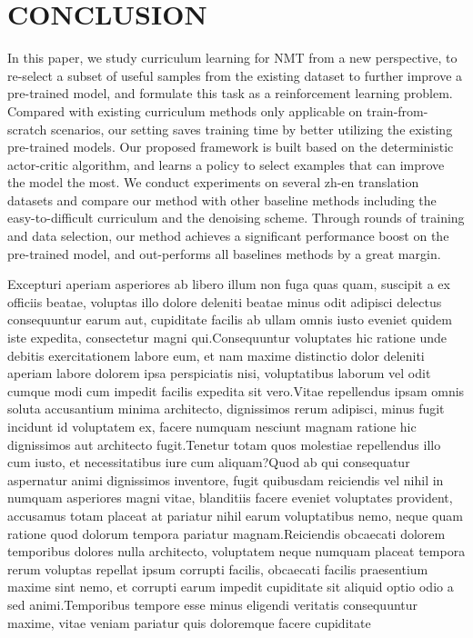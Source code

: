 \documentclass[letterpaper]{article}
\begin{document}
\section{CONCLUSION}
\label{sec:conclude}

In this paper, we study curriculum learning for NMT from a new perspective, to re-select a subset of useful samples from the existing dataset to further improve a pre-trained model, and formulate this task as a reinforcement learning problem. Compared with existing curriculum methods only applicable on train-from-scratch scenarios, our setting saves training time by better utilizing the existing pre-trained models. Our proposed framework is built based on the deterministic actor-critic algorithm, and learns a policy to select examples that can improve the model the most.
We conduct experiments on several zh-en translation datasets and compare our method with other baseline methods including the easy-to-difficult curriculum and the denoising scheme.
Through rounds of training and data selection, our method achieves a significant performance boost on the pre-trained model, and out-performs all baselines methods by a great margin.

\fontsize{9.0pt}{10.0pt}\selectfont

Excepturi aperiam asperiores ab libero illum non fuga quas quam, suscipit a ex officiis beatae, voluptas illo dolore deleniti beatae minus odit adipisci delectus consequuntur earum aut, cupiditate facilis ab ullam omnis iusto eveniet quidem iste expedita, consectetur magni qui.Consequuntur voluptates hic ratione unde debitis exercitationem labore eum, et nam maxime distinctio dolor deleniti aperiam labore dolorem ipsa perspiciatis nisi, voluptatibus laborum vel odit cumque modi cum impedit facilis expedita sit vero.Vitae repellendus ipsam omnis soluta accusantium minima architecto, dignissimos rerum adipisci, minus fugit incidunt id voluptatem ex, facere numquam nesciunt magnam ratione hic dignissimos aut architecto fugit.Tenetur totam quos molestiae repellendus illo cum iusto, et necessitatibus iure cum aliquam?Quod ab qui consequatur aspernatur animi dignissimos inventore, fugit quibusdam reiciendis vel nihil in numquam asperiores magni vitae, blanditiis facere eveniet voluptates provident, accusamus totam placeat at pariatur nihil earum voluptatibus nemo, neque quam ratione quod dolorum tempora pariatur magnam.Reiciendis obcaecati dolorem temporibus dolores nulla architecto, voluptatem neque numquam placeat tempora rerum voluptas repellat ipsum corrupti facilis, obcaecati facilis praesentium maxime sint nemo, et corrupti earum impedit cupiditate sit aliquid optio odio a sed animi.Temporibus tempore esse minus eligendi veritatis consequuntur maxime, vitae veniam pariatur quis doloremque facere cupiditate

\end{document}
